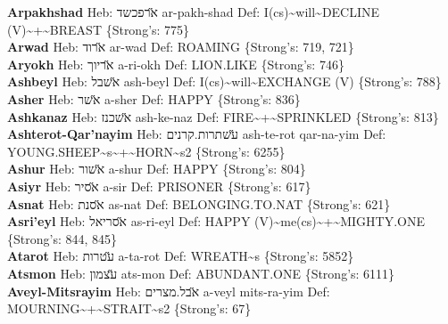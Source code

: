 {\textbf{Arpakhshad} Heb: {\large\H ארפכשד} ar-pakh-shad Def: I(cs)\textasciitilde{}will\textasciitilde{}DECLINE (V)\textasciitilde{}+\textasciitilde{}BREAST \{Strong's: 775\}\hfill{}\\

\textbf{Arwad} Heb: {\large\H ארוד} ar-wad Def: ROAMING \{Strong's: 719, 721\}\hfill{}\\

\textbf{Aryokh} Heb: {\large\H אריוך} a-ri-okh Def: LION.LIKE \{Strong's: 746\}\hfill{}\\

\textbf{Ashbeyl} Heb: {\large\H אשבל} ash-beyl Def: I(cs)\textasciitilde{}will\textasciitilde{}EXCHANGE (V) \{Strong's: 788\}\hfill{}\\

\textbf{Asher} Heb: {\large\H אשר} a-sher Def: HAPPY \{Strong's: 836\}\hfill{}\\

\textbf{Ashkanaz} Heb: {\large\H אשכנז} ash-ke-naz Def: FIRE\textasciitilde{}+\textasciitilde{}SPRINKLED \{Strong's: 813\}\hfill{}\\

\textbf{Ashterot-Qar'nayim} Heb: {\large\H עשתרות.קרנים} ash-te-rot qar-na-yim Def: YOUNG.SHEEP\textasciitilde{}s\textasciitilde{}+\textasciitilde{}HORN\textasciitilde{}s2 \{Strong's: 6255\}\hfill{}\\

\textbf{Ashur} Heb: {\large\H אשור} a-shur Def: HAPPY \{Strong's: 804\}\hfill{}\\

\textbf{Asiyr} Heb: {\large\H אסיר} a-sir Def: PRISONER \{Strong's: 617\}\hfill{}\\

\textbf{Asnat} Heb: {\large\H אסנת} as-nat Def: BELONGING.TO.NAT \{Strong's: 621\}\hfill{}\\

\textbf{Asri'eyl} Heb: {\large\H אסריאל} as-ri-eyl Def: HAPPY (V)\textasciitilde{}me(cs)\textasciitilde{}+\textasciitilde{}MIGHTY.ONE \{Strong's: 844, 845\}\hfill{}\\

\textbf{Atarot} Heb: {\large\H עטרות} a-ta-rot Def: WREATH\textasciitilde{}s \{Strong's: 5852\}\hfill{}\\

\textbf{Atsmon} Heb: {\large\H עצמון} ats-mon Def: ABUNDANT.ONE \{Strong's: 6111\}\hfill{}\\

\textbf{Aveyl-Mitsrayim} Heb: {\large\H אבל.מצרים} a-veyl mits-ra-yim Def: MOURNING\textasciitilde{}+\textasciitilde{}STRAIT\textasciitilde{}s2 \{Strong's: 67\}\hfill{}\\

}
